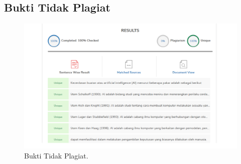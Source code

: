 \subsection{Bukti Tidak Plagiat}
\begin{figure}[H]
	\includegraphics[width=1\textwidth]{figures/1184077/chapter1/plagiat.PNG}
	\centering
	\caption{Bukti Tidak Plagiat.}
\end{figure}